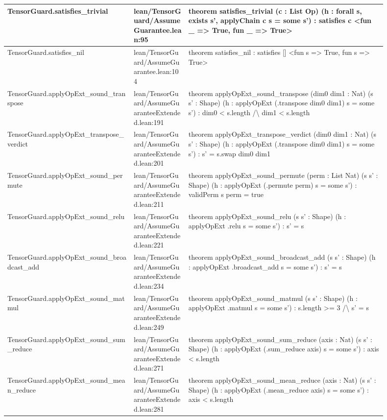 \documentclass[10pt]{article}
\begin{document}
\begin{longtable}{|p{0.30\linewidth}|p{0.13\linewidth}|p{0.47\linewidth}|}
\hline
TensorGuard.satisfies\_trivial & lean/TensorGuard/AssumeGuarantee.lean:95 & theorem satisfies\_trivial (c : List Op) (h : forall s, exists s', applyChain c s = some s') : satisfies c <fun \_ => True, fun \_ => True> \\
\hline
TensorGuard.satisfies\_nil & lean/TensorGuard/AssumeGuarantee.lean:104 & theorem satisfies\_nil : satisfies [] <fun s => True, fun s => True> \\
\hline
TensorGuard.applyOpExt\_sound\_transpose & lean/TensorGuard/AssumeGuaranteeExtended.lean:191 & theorem applyOpExt\_sound\_transpose (dim0 dim1 : Nat) (s s' : Shape) (h : applyOpExt (.transpose dim0 dim1) s = some s') : dim0 < s.length /\textbackslash{} dim1 < s.length \\
\hline
TensorGuard.applyOpExt\_transpose\_verdict & lean/TensorGuard/AssumeGuaranteeExtended.lean:201 & theorem applyOpExt\_transpose\_verdict (dim0 dim1 : Nat) (s s' : Shape) (h : applyOpExt (.transpose dim0 dim1) s = some s') : s' = s.swap dim0 dim1 \\
\hline
TensorGuard.applyOpExt\_sound\_permute & lean/TensorGuard/AssumeGuaranteeExtended.lean:211 & theorem applyOpExt\_sound\_permute (perm : List Nat) (s s' : Shape) (h : applyOpExt (.permute perm) s = some s') : validPerm s perm = true \\
\hline
TensorGuard.applyOpExt\_sound\_relu & lean/TensorGuard/AssumeGuaranteeExtended.lean:221 & theorem applyOpExt\_sound\_relu (s s' : Shape) (h : applyOpExt .relu s = some s') : s' = s \\
\hline
TensorGuard.applyOpExt\_sound\_broadcast\_add & lean/TensorGuard/AssumeGuaranteeExtended.lean:234 & theorem applyOpExt\_sound\_broadcast\_add (s s' : Shape) (h : applyOpExt .broadcast\_add s = some s') : s' = s \\
\hline
TensorGuard.applyOpExt\_sound\_matmul & lean/TensorGuard/AssumeGuaranteeExtended.lean:249 & theorem applyOpExt\_sound\_matmul (s s' : Shape) (h : applyOpExt .matmul s = some s') : s.length >= 3 /\textbackslash{} s' = s \\
\hline
TensorGuard.applyOpExt\_sound\_sum\_reduce & lean/TensorGuard/AssumeGuaranteeExtended.lean:271 & theorem applyOpExt\_sound\_sum\_reduce (axis : Nat) (s s' : Shape) (h : applyOpExt (.sum\_reduce axis) s = some s') : axis < s.length \\
\hline
TensorGuard.applyOpExt\_sound\_mean\_reduce & lean/TensorGuard/AssumeGuaranteeExtended.lean:281 & theorem applyOpExt\_sound\_mean\_reduce (axis : Nat) (s s' : Shape) (h : applyOpExt (.mean\_reduce axis) s = some s') : axis < s.length \\

\end{longtable}
\end{document}
